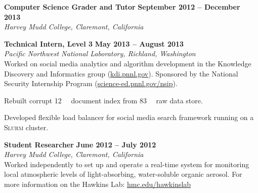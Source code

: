 \documentclass[10pt]{article}
\newenvironment{innerlist}[1][\enskip\textbullet]%
        {\begin{compactitem}[#1]}{\end{compactitem}}
\newcommand{\blankline}{\quad\pagebreak[2]\vspace{-0.3\baselineskip}}
\newcommand{\apbs}{\textsc{Apbs}}
\newcommand{\cuda}{\textsc{Cuda}}
\newcommand{\boinc}{\textsc{Boinc}}
\newcommand{\slurm}{\textsc{Slurm}}
\begin{document}
    \blankline

    \textbf{Computer Science Grader and Tutor}
    \hfill \textbf{September 2012 -- December 2013} \\
    \textit{Harvey Mudd College, Claremont, California}

    \blankline

    \textbf{Technical Intern, Level 3}
    \hfill \textbf{May 2013 -- August 2013} \\
    \textit{Pacific Northwest National Laboratory,
      Richland, Washington} \\
    Worked on social media analytics and algorithm development in the
    Knowledge Discovery and Informatics group
    (\href{http://kdi.pnnl.gov/}{kdi.pnnl.gov}). Sponsored by the
    National Security Internship Program
    (\href{http://science-ed.pnnl.gov/nsip/}{science-ed.pnnl.gov/nsip}).
    \begin{innerlist}
    \item Rebuilt corrupt \SI{12}{\tebi\byte} document index from
      \SI{83}{\tebi\byte} raw data store.
    \item Developed flexible load balancer for social media search
      framework running on a \slurm{} cluster.
    \end{innerlist}

    \blankline

    \textbf{Student Researcher}
    \hfill \textbf{June 2012 -- July 2012} \\
    \textit{Harvey Mudd College, Claremont, California} \\
    Worked independently to set up and operate a real-time system for
    monitoring local atmospheric levels of light-absorbing,
    water-soluble organic aerosol. For more information on the Hawkins
    Lab:
    \href{http://newwww.hmc.edu/hawkinslab/LeliaHawkins_HMC/Welcome.html}
    {hmc.edu/hawkinslab}


\end{document}
